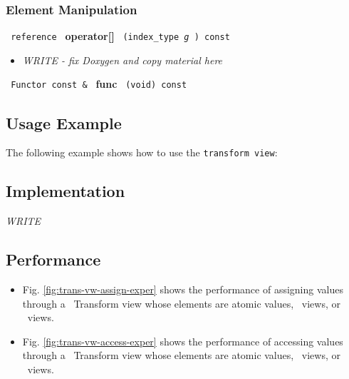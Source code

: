\subsubsection{ Element Manipulation}

\noindent
\texttt{%
reference
}
\newline
\textbf{operator[]}%
\texttt{%
(index\_type
\textit{g}%
) const
}

\begin{itemize}
\item
\textit{WRITE - fix Doxygen and copy material here}
\end{itemize}

\noindent
\texttt{%
Functor const \&
}
\newline
\textbf{func}%
\texttt{%
(void) const
}

\subsection{Usage Example} \label{sec-trans-vw-use}

The following example shows how to use the \texttt{transform view}:


\subsection{Implementation} \label{sec-trans-vw-impl}

\textit{WRITE}

\subsection{Performance} \label{sec-trans-vw-perf}

\begin{itemize}
\item
Fig. \ref{fig:trans-vw-assign-exper}
shows the performance of assigning values through a \stapl\ Transform view
whose elements are atomic values, \stl\ views, or \stapl\ views.
\item
Fig. \ref{fig:trans-vw-access-exper}
shows the performance of accessing values through a \stapl\ Transform view
whose elements are atomic values, \stl\ views, or \stapl\ views.
\end{itemize}

